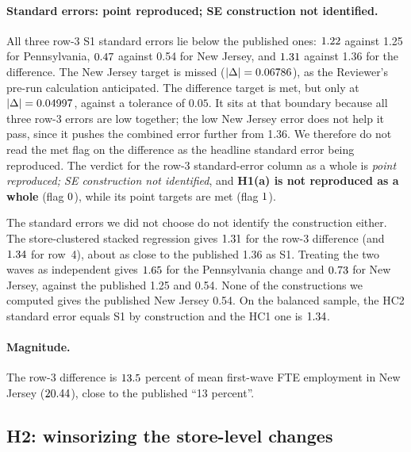 \documentclass[11pt]{article}
\begin{document}
\paragraph{Standard errors: point reproduced; SE construction not identified.} All three
row-3 S1 standard errors lie below the published ones: $1.22$ against 1.25 for
Pennsylvania, $0.47$ against 0.54 for New Jersey, and $1.31$ against 1.36 for the
difference. The New Jersey target is missed ($|\Delta| = 0.06786$), as the
Reviewer's pre-run calculation anticipated. The difference target is met, but only at
$|\Delta| = 0.04997$, against a tolerance of $0.05$. It sits at that boundary
because all three row-3 errors are low together; the low New Jersey error does not help it
pass, since it pushes the combined error further from 1.36. We therefore do not read the met flag on the difference as the
headline standard error being reproduced. The verdict for the row-3 standard-error column
as a whole is \emph{point reproduced; SE construction not identified}, and \textbf{H1(a) is
not reproduced as a whole} (flag $0$), while its point targets are met (flag
$1$).

The standard errors we did not choose do not identify the construction either. The
store-clustered stacked regression gives $1.31$ for the row-3 difference (and
$1.34$ for row~4), about as close to the published 1.36 as S1. Treating the two
waves as independent gives $1.65$ for the Pennsylvania change and $0.73$ for New
Jersey, against the published 1.25 and 0.54. None of the constructions we computed gives the
published New Jersey 0.54. On the balanced sample, the HC2 standard error equals S1 by
construction and the HC1 one is $1.34$.

\paragraph{Magnitude.} The row-3 difference is $13.5$ percent of mean first-wave FTE
employment in New Jersey ($20.44$), close to the published ``13 percent''.

\subsection{H2: winsorizing the store-level changes}
\end{document}
